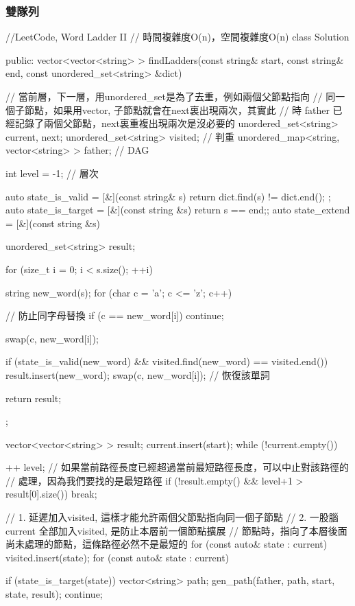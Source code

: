 \subsubsection{雙隊列}

\begin{Code}
//LeetCode, Word Ladder II
// 時間複雜度O(n)，空間複雜度O(n)
class Solution {
public:
    vector<vector<string> > findLadders(const string& start,
            const string& end, const unordered_set<string> &dict) {
        // 當前層，下一層，用unordered_set是為了去重，例如兩個父節點指向
        // 同一個子節點，如果用vector, 子節點就會在next裏出現兩次，其實此
        // 時 father 已經記錄了兩個父節點，next裏重複出現兩次是沒必要的
        unordered_set<string> current, next;
        unordered_set<string> visited; // 判重
        unordered_map<string, vector<string> > father; // DAG

        int level = -1;  // 層次

        auto state_is_valid = [&](const string& s) {
            return dict.find(s) != dict.end();
        };
        auto state_is_target = [&](const string &s) {return s == end;};
        auto state_extend = [&](const string &s) {
            unordered_set<string> result;

            for (size_t i = 0; i < s.size(); ++i) {
                string new_word(s);
                for (char c = 'a'; c <= 'z'; c++) {
                    // 防止同字母替換
                    if (c == new_word[i]) continue;

                    swap(c, new_word[i]);

                    if (state_is_valid(new_word) &&
                            visited.find(new_word) == visited.end()) {
                        result.insert(new_word);
                    }
                    swap(c, new_word[i]); // 恢復該單詞
                }
            }

            return result;
        };

        vector<vector<string> > result;
        current.insert(start);
        while (!current.empty()) {
            ++ level;
            // 如果當前路徑長度已經超過當前最短路徑長度，可以中止對該路徑的
            // 處理，因為我們要找的是最短路徑
            if (!result.empty() && level+1 > result[0].size()) break;

            // 1. 延遲加入visited, 這樣才能允許兩個父節點指向同一個子節點
            // 2. 一股腦current 全部加入visited, 是防止本層前一個節點擴展
            // 節點時，指向了本層後面尚未處理的節點，這條路徑必然不是最短的
            for (const auto& state : current)
                visited.insert(state);
            for (const auto& state : current) {
                if (state_is_target(state)) {
                    vector<string> path;
                    gen_path(father, path, start, state, result);
                    continue;
                }

}}}}
\end{Code}
